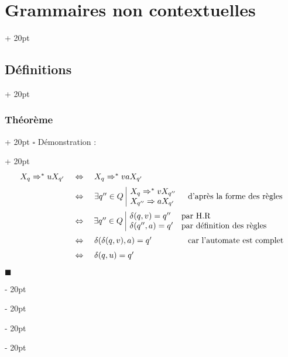 \documentclass[a4paper, 12pt, twoside]{article}
\newcommand{\ssi}{\ \Leftrightarrow \ }
\newcommand{\ind}[1][20pt]{\advance\leftskip + #1}
\newcommand{\deind}[1][20pt]{\advance\leftskip - #1}
\newenvironment{indt}[2][20pt]{#2 \par \ind[#1]}{\par \deind} %
\newenvironment{proof}[1][{Démonstration :}]{\begin{indt}{$\square$ #1}}{$\blacksquare$ \end{indt}}
\begin{document}
\begin{indt}{\section{Grammaires non contextuelles}}
\begin{indt}{\subsection{Définitions}}
\begin{indt}{\subsubsection{Théorème}}
\begin{proof}
                    \[
                        \begin{array}{rcll}
                            X_q \Rightarrow^* uX_{q'}
                            &\ssi& X_q \Rightarrow^* vaX_{q'}
                            \vspace{6pt}
                            \\
                            &\ssi& \exists q'' \in Q\
                            \begin{array}{|l}
                                X_q \Rightarrow^* vX_{q''}
                                \\
                                X_{q''} \Rightarrow aX_{q'}
                            \end{array}
                            &
                            \text{d'après la forme des règles}
                            \vspace{6pt}
                            \\
                            &\ssi&
                            \multicolumn{2}{c}{
                                \kern-13pt
                                \exists q'' \in Q\
                                \begin{array}{|ll}
                                    \delta(q, v) = q''
                                    & \text{par H.R}
                                    \\
                                    \delta(q'', a) = q'
                                    & \text{par définition des règles}
                                \end{array}
                            }
                            \vspace{6pt}
                            \\
                            &\ssi& \delta(\delta(q, v), a) = q'
                            & \text{car l'automate est complet}
                            \vspace{6pt}
                            \\
                            &\ssi& \delta(q, u) = q'
                        \end{array}
                    \]

                    \vspace{6pt}
                    

\end{proof}
\end{indt}
\end{indt}
\end{indt}
\end{document}
